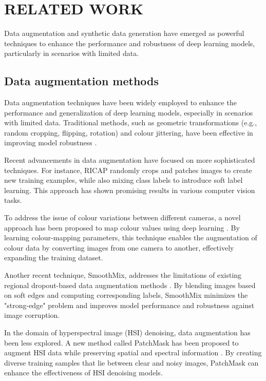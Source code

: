 \section{\uppercase{Related Work}}
\label{sec:methodology}
Data augmentation and synthetic data generation have emerged as powerful techniques to enhance the performance and robustness of deep learning models, particularly in scenarios with limited data.

\subsection{Data augmentation methods}
Data augmentation techniques have been widely employed to enhance the performance and generalization of deep learning models, especially in scenarios with limited data. Traditional methods, such as geometric transformations (e.g., random cropping, flipping, rotation) and colour jittering, have been effective in improving model robustness \cite{traditional}.

Recent advancements in data augmentation have focused on more sophisticated techniques. For instance, RICAP \cite{random_cropping} randomly crops and patches images to create new training examples, while also mixing class labels to introduce soft label learning. This approach has shown promising results in various computer vision tasks.

To address the issue of colour variations between different cameras, a novel approach has been proposed to map colour values using deep learning \cite{colour}. By learning colour-mapping parameters, this technique enables the augmentation of colour data by converting images from one camera to another, effectively expanding the training dataset.

Another recent technique, SmoothMix, addresses the limitations of existing regional dropout-based data augmentation methods \cite{smooth_mix}. By blending images based on soft edges and computing corresponding labels, SmoothMix minimizes the "strong-edge" problem and improves model performance and robustness against image corruption.

In the domain of hyperspectral image (HSI) denoising, data augmentation has been less explored. A new method called PatchMask has been proposed to augment HSI data while preserving spatial and spectral information \cite{patch_mask}. By creating diverse training samples that lie between clear and noisy images, PatchMask can enhance the effectiveness of HSI denoising models.

